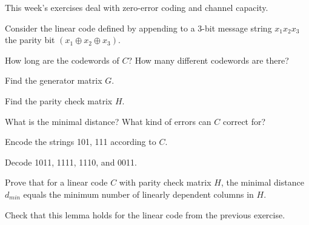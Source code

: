 \documentclass[a4paper,10pt,landscape,twocolumn]{scrartcl}
\begin{document}
\practiceproblems

{\sffamily\noindent
This week's exercises deal with zero-error coding and channel capacity. \practiceinstructions
}

\begin{exercise}
Consider the linear code defined by appending to a 3-bit message string $x_1x_2x_3$ the parity bit $(x_1 \oplus x_2 \oplus x_3)$.

\begin{subex}
How long are the codewords of $C$? How many different codewords are there?
\end{subex}

\begin{subex}
Find the generator matrix $G$.
\end{subex}

\begin{subex}
Find the parity check matrix $H$.
\end{subex}

\begin{subex}
What is the minimal distance? What kind of errors can $C$ correct for?
\end{subex}

\begin{subex}
Encode the strings 101, 111 according to $C$.
\end{subex}

\begin{subex}
Decode 1011, 1111, 1110, and 0011.
\end{subex}
\end{exercise}

\begin{exercise}
Prove that for a linear code $C$ with parity check matrix $H$, the minimal distance $d_{min}$ equals the minimum number of linearly dependent columns in $H$.

Check that this lemma holds for the linear code from the previous exercise.
\end{exercise}
\end{document}
